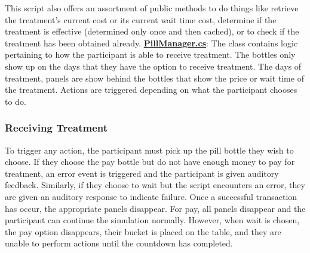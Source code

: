 \documentclass{article}
\begin{document}
This script also offers an assortment of public methods to do things like retrieve the treatment's current cost or its current wait time cost, determine if the treatment is effective (determined only once and then cached), or to check if the treatment has been obtained already. \newline \newline
\href{https://bit.ly/2JDPChz}{\textbf{PillManager.cs}}: The class contains logic pertaining to how the participant is able to receive treatment. The bottles only show up on the days that they have the option to receive treatment. The days of treatment, panels are show behind the bottles that show the price or wait time of the treatment. Actions are triggered depending on what the participant chooses to do.

\subsubsection{Receiving Treatment} %
To trigger any action, the participant must pick up the pill bottle they wish to choose. If they choose the pay bottle but do not have enough money to pay for treatment, an error event is triggered and the participant is given auditory feedback. Similarly, if they choose to wait but the script encounters an error, they are given an auditory response to indicate failure. Once a successful transaction has occur, the appropriate panels disappear. For pay, all panels disappear and the participant can continue the simulation normally. However, when wait is chosen, the pay option disappears, their bucket is placed on the table, and they are unable to perform actions until the countdown has completed.
\end{document}
